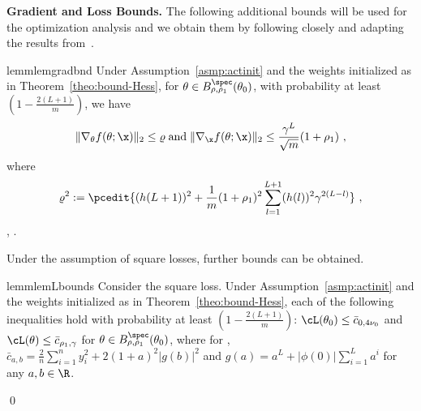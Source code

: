 {\bf Gradient and Loss Bounds.}
The following additional bounds will be used for the optimization analysis and we obtain them by following closely and adapting the results from~\citep{AB-PCV-LZ-MB:22}. 

\begin{restatable}{lemm}{lemgradbnd}
\label{cor:gradient-bounds}
Under Assumption~\ref{asmp:actinit} and the weights initialized as in Theorem~\ref{theo:bound-Hess}, for $\theta \in B_{\rho,\rho_1}^{\spec}(\theta_0)$, with probability at least $\left(1-\frac{2(L+1)}{m}\right)$, we have
\begin{equation}
\begin{split}
\|\nabla_\theta f(\theta;\x)\|_2  \leq \varrho\; \text{and}\; \|\nabla_{\x} f(\theta;\x)\|_2 \leq \frac{\gamma^{L}}{\sqrt{m}}(1+\rho_1)~,
\end{split}
\end{equation}
where
$$\varrho^2  := \pcedit{(h(L+1))^2+\frac{1}{m}(1+\rho_1)^2\sum_{l=1}^{L+1}(h(l))^2\gamma^{2(L-l)}}~,
$$
,  .
\end{restatable}

Under the assumption of square losses, further bounds can be obtained.

\begin{restatable}{lemm}{lemLbounds}
Consider the square loss. Under Assumption~\ref{asmp:actinit} and the weights initialized as in Theorem~\ref{theo:bound-Hess}, each of the following inequalities hold with probability at least $\left(1-\frac{2(L+1)}{m}\right)$: 
$\cL(\theta_0)\leq \bar{c}_{0,4\nu_0}$ and 
$\cL(\theta)\leq \bar{c}_{\rho_1,\gamma}$ 
for $\theta \in B_{\rho,\rho_1}^{\spec}(\theta_0)$, where for ,  $\bar{c}_{a,b}=\frac{2}{n}\sum^n_{i=1}y_i^2+2(1+a)^2|g(b)|^2$ and $g(a)=a^L+|\phi(0)|\sum^L_{i=1}a^i$ for any $a,b\in\R$.
\label{lem:BoundTotalLoss}
\end{restatable}
%
\proof {}
\qed
%

